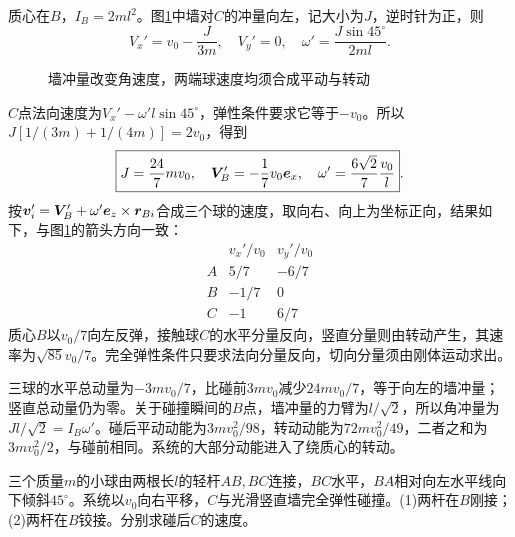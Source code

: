 \begin{solution}
质心在$B$，$I_B=2ml^2$。图\ref{fig:hw5-2-s}中墙对$C$的冲量向左，记大小为$J$，逆时针为正，则
\[
 V_x'=v_0-\frac{J}{3m},\quad V_y'=0,\quad
 \omega'=\frac{J\sin45^\circ}{2ml}.
\]

\begin{figure}[H]\centering
{}
\caption{墙冲量改变角速度，两端球速度均须合成平动与转动}\label{fig:hw5-2-s}
\end{figure}

$C$点法向速度为$V_x'-\omega'l\sin45^\circ$，弹性条件要求它等于$-v_0$。所以$J[1/(3m)+1/(4m)]=2v_0$，得到
\[
 \boxed{J=\frac{24}{7}mv_0,\quad
 \bm{V}_B'=-\frac17v_0\bm{e}_x,\quad
 \omega'=\frac{6\sqrt2}{7}\frac{v_0}{l}}.
\]
按$\bm{v}_i'=\bm{V}_B'+\omega'\bm{e}_z\times\bm{r}_{Bi}$合成三个球的速度，取向右、向上为坐标正向，结果如下，与图\ref{fig:hw5-2-s}的箭头方向一致：
\[
 \begin{array}{c|cc}
 &v_x'/v_0&v_y'/v_0\\\hline
 A&5/7&-6/7\\ B&-1/7&0\\ C&-1&6/7
 \end{array}
\]
质心$B$以$v_0/7$向左反弹，接触球$C$的水平分量反向，竖直分量则由转动产生，其速率为$\sqrt{85}v_0/7$。完全弹性条件只要求法向分量反向，切向分量须由刚体运动求出。

三球的水平总动量为$-3mv_0/7$，比碰前$3mv_0$减少$24mv_0/7$，等于向左的墙冲量；竖直总动量仍为零。关于碰撞瞬间的$B$点，墙冲量的力臂为$l/\sqrt2$，所以角冲量为$Jl/\sqrt2=I_B\omega'$。碰后平动动能为$3mv_0^2/98$，转动动能为$72mv_0^2/49$，二者之和为$3mv_0^2/2$，与碰前相同。系统的大部分动能进入了绕质心的转动。

\end{solution}



\begin{example}[同一构形的刚接与铰接碰撞]\label{ex:hw5-3}

三个质量$m$的小球由两根长$l$的轻杆$AB,BC$连接，$BC$水平，$BA$相对向左水平线向下倾斜$45^\circ$。系统以$v_0$向右平移，$C$与光滑竖直墙完全弹性碰撞。(1)两杆在$B$刚接；(2)两杆在$B$铰接。分别求碰后$C$的速度。

\end{example}


